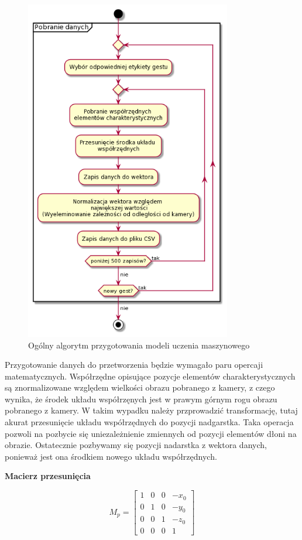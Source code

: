     \begin{figure}[H]
        \begin{center}
            \includegraphics[width=9cm]{../images/get_data.png}
            \caption{Ogólny algorytm przygotowania modeli uczenia maszynowego}
        \end{center}
    \end{figure}
    
    \quad Przygotowanie danych do przetworzenia będzie wymagało paru opercaji matematycznych. Współrzędne opisujące pozycje elementów charakterystycznych są znormalizowane względem wielkości obrazu pobranego z kamery, z czego wynika, że środek układu współrzęnych jest w prawym górnym rogu obrazu pobranego z kamery. W takim wypadku należy przprowadzić transformację, tutaj akurat przesunięcie układu współrzędnych do pozycji nadgarstka. Taka operacja pozwoli na pozbycie się uniezależnienie zmiennych od pozycji elementów dłoni na obrazie. Ostatecznie pozbywamy się pozycji nadarstka z wektora danych, ponieważ jest ona środkiem nowego układu współrzędnych. 
    
    \quad \textbf{Macierz przesunięcia}
    
    \begin{equation*}
        M_p = 
        \begin{bmatrix}
        1 & 0 & 0 & -x_0 \\
        0 & 1 & 0 & -y_0 \\
        0 & 0 & 1 & -z_0 \\
        0 & 0 & 0 & 1
        \end{bmatrix}
    \end{equation*}
    
